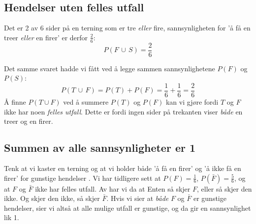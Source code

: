 \subsection{Hendelser uten felles utfall} \vspace{-5pt}
 \qquad
{}
Det er 2 av 6 sider på en terning som er tre \textsl{eller} fire, sannsynligheten for 'å få en treer \textsl{eller} en firer' er derfor $ \frac{2}{6} $:
\[ P(F\,\cup\,S)=\frac{2}{6} \]

Det samme svaret hadde vi fått ved å legge sammen sannsynlighetene $P(F)$ og $P(S)$:
\[ P(T\,\cup\,F)=P(T)+P(F)=\frac{1}{6}+\frac{1}{6}=\frac{2}{6} \]
Å finne $ P(T\cup F) $ ved å summere $ P(T) $ og $ P(F) $ kan vi gjøre fordi $ T $ og $ F $ ikke har noen \textit{felles utfall}. Dette er fordi ingen sider på trekanten viser \textsl{både} en treer og en firer. \regv

\subsection{Summen av alle sannsynligheter er 1}
Tenk at vi kaster en terning og at vi holder både 'å få en firer' og 'å ikke få en firer' for gunstige hendelser . Vi har tidligere sett at $ {P(F)=\frac{1}{6}} $, $ {P(\bar{F})=\frac{5}{6} }$, og at $ F $ og $ \bar{F} $ ikke har felles utfall. Av  har vi da at
Enten så skjer $ F $, eller så skjer den ikke. Og skjer den ikke, så skjer $ \bar{F} $. Hvis vi sier at \textsl{både} $ F $ og $ \bar{F} $ er gunstige hendelser, sier vi altså at alle mulige utfall er gunstige, og da gir   en sannsynlighet lik 1. \regv
 

